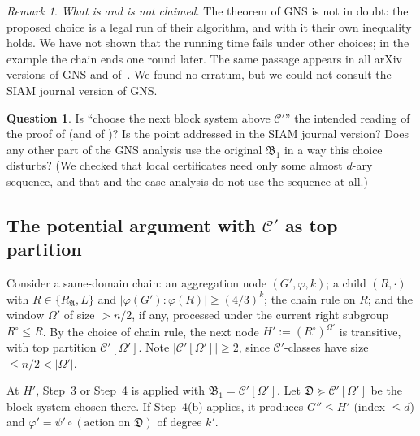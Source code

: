\documentclass[11pt]{article}
\theoremstyle{plain}
\theoremstyle{definition}
\newtheorem{question}[theorem]{Question}
\theoremstyle{remark}
\newtheorem{remark}[theorem]{Remark}
\theoremstyle{named}
\theoremstyle{namedrm}
\newcommand{\fB}{\mathfrak{B}}
\newcommand{\fD}{\mathfrak{D}}
\newcommand{\fA}{\mathfrak{A}}
\newcommand{\Cp}{\mathcal{C}'}
\begin{document}
\begin{remark}
\emph{What is and is not claimed.} The theorem of GNS is not in doubt: the proposed choice is a legal run
of their algorithm, and with it their own inequality holds. We have not shown that the running time
fails under other choices; in the example the chain ends one round later. The same passage appears in all
arXiv versions of GNS and of~\cite{Neu20}. We found no erratum, but we could not consult the SIAM journal
version of GNS.
\end{remark}

\begin{question}\label{q:gap1}
Is ``choose the next block system above $\Cp$'' the intended reading of the proof of
\cite[Lemma~7.2]{GNS} (and of \cite[Lemma~4.36]{Neu20})? Is the point addressed in the SIAM journal
version? Does any other part of the GNS analysis use the original $\fB_1$ in a way this choice disturbs?
(We checked that local certificates need only some almost $d$-ary sequence, and that
\cite[Thm.~5.9, Cor.~6.5]{GNS} and the case analysis do not use the sequence at all.)
\end{question}

\subsection{The potential argument with $\Cp$ as top partition}\label{sec:potential}

Consider a same-domain chain: an aggregation node $(G',\varphi,k)$; a child $(R,\cdot)$ with $R\in\{R_\fA,L\}$
and $|\varphi(G'):\varphi(R)|\ge(4/3)^k$; the chain rule on $R$; and the window $\Omega'$ of size $>n/2$, if any,
processed under the current right subgroup $R^\circ\le R$. By the choice of chain rule, the next node
$H':=(R^\circ)^{\Omega'}$ is transitive, with top partition $\Cp[\Omega']$. Note $|\Cp[\Omega']|\ge2$, since
$\Cp$-classes have size $\le n/2<|\Omega'|$.

At $H'$, Step~3 or Step~4 is applied with $\fB_1=\Cp[\Omega']$. Let $\fD\succeq\Cp[\Omega']$ be the block system
chosen there. If Step~4(b) applies, it produces $G''\le H'$ (index $\le d$) and $\varphi'=\psi'\circ(\text{action
on }\fD)$ of degree $k'$.
\end{document}
